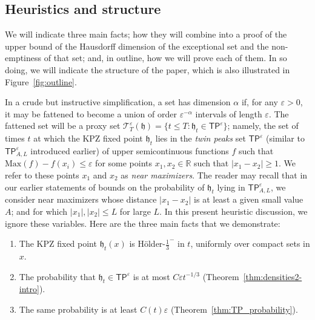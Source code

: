 \documentclass[oneside,final,11pt]{amsart}
\theoremstyle{definition}
\newcommand{\fh}{\mathfrak{h}}
\newcommand{\TP}[1]{\mathsf{TP}_{\!\!#1}}
\newcommand{\TPno}{\mathsf{TP}}
\newcommand{\bJ}{\mathsf{J}}
\newcommand{\R}{\mathbb{R}}
\newcommand{\CT}{\mathcal{T}}
\newcommand{\dens}{\CF}
\newcommand{\1}[1]{\mathbf{1}_{#1}}
\newcommand{\eps}{\varepsilon}
\newcommand{\kmtext}[1]{{\color{red}[KM:#1]}}
\newcommand{\Max}{\mathrm{Max}}
\newcommand{\CF}{\mathcal{F}}
\numberwithin{equation}{section}
\begin{document}

\subsection{Heuristics and structure}
\label{sec:heuristic}

We will indicate three main facts; how they will combine into a proof of the upper bound of the Hausdorff dimension of the exceptional set and the non-emptiness of that set; and, in outline, how we will prove each of them.
In so doing, we will indicate the structure of the paper, which is also illustrated in Figure~\ref{fig:outline}.


In a crude but instructive simplification, a set has dimension $\alpha$ if, for any $\eps > 0$, it may be fattened to become a union of order $\eps^{-\alpha}$ intervals of length $\eps$.
The fattened set will be a proxy set $\CT_T^\eps(\fh) = \{t\leq T: \fh_t \in \TPno^\eps\}$; namely, the set
of times $t$ at which the KPZ fixed point $\fh_t$ lies in the {\em twin peaks} set $\TPno^\eps$ (similar to $\TP{A,L}^\eps$ introduced earlier) %
of upper semicontinuous functions $f$ such that $\Max(f) - f(x_i) \leq \eps$ for some points $x_1, x_2 \in \R$ such that $|x_1-x_2|\geq 1$. We refer to these points $x_1$ and $x_2$ as \emph{near maximizers}. The reader may recall that in our earlier statements of bounds on the probability of $\fh_t$ lying in $\TP{A,L}^\varepsilon$, we consider near maximizers whose distance $|x_1-x_2|$ is at least a given small value $A$; and for which $|x_1|,|x_2|\leq L$ for large $L$. In this present heuristic discussion, we ignore these variables. Here are the three main facts that we demonstrate:
%
\begin{enumerate}[label=(\roman*)]
  \item\label{heur:1} The  KPZ fixed point $\fh_t(x)$ is H\"older-$\tfrac{1}{3}^{{\scriptscriptstyle-}}$ in $t$, uniformly over compact sets in $x$.

  \item\label{heur:2} The probability that $\fh_t \in \TPno^\eps$ is at most $C\eps t^{-1/3}$ (Theorem~\ref{thm:densities2-intro}).

  \item\label{heur:3} The same probability is at least $C(t) \eps$ (Theorem~\ref{thm:TP_probability}).
\end{enumerate}
\end{document}
